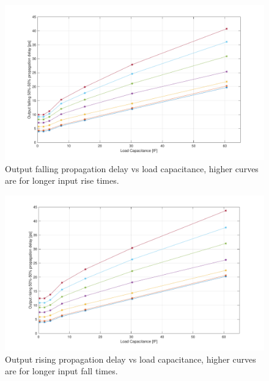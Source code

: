 \documentclass[a4paper]{article}
\begin{document}
\begin{figure}[H]
	\centering
	\includegraphics[width=\linewidth]{../INV_X4/simulations/tp_L.pdf}
	\caption{Output falling propagation delay vs load capacitance, higher curves are for longer input rise times.}
	\label{fig:inv_tp_L}
\end{figure}
\begin{figure}[H]
	\centering
	\includegraphics[width=\linewidth]{../INV_X4/simulations/tp_H.pdf}
	\caption{Output rising propagation delay vs load capacitance, higher curves are for longer input fall times.}
	\label{fig:inv_tp_H}
\end{figure}
\end{document}
